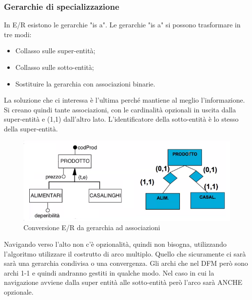 \subsubsection{Gerarchie di specializzazione}
In E/R esistono le gerarchie "is a". Le gerarchie "is a" si possono trasformare in tre modi:
\begin{itemize}
	\item Collasso sulle super-entità;
	\item Collasso sulle sotto-entità;
	\item Sostituire la gerarchia con associazioni binarie.
\end{itemize}
La soluzione che ci interessa è l'ultima perché mantiene al meglio l'informazione. Si creano quindi tante associazioni, con le cardinalità opzionali in uscita dalla super-entità e (1,1) dall'altro lato. L'identificatore della sotto-entità è lo stesso della super-entità.
\begin{figure}[H]
	\begin{center}
		\includegraphics[width=0.8\linewidth]{img/isaconversion.png}
		\caption{Conversione E/R da gerarchia ad associazioni}
	\end{center}
\end{figure}
\begin{warn}
	Navigando verso l'alto non c'è opzionalità, quindi non bisogna, utilizzando l'algoritmo utilizzare il costrutto di arco multiplo. Quello che sicuramente ci sarà sarà una gerarchia condivisa o una convergenza. Gli archi che nel DFM però sono archi 1-1 e quindi andranno gestiti in qualche modo. Nel caso in cui la navigazione avviene dalla super entità alle sotto-entità però l'arco sarà ANCHE opzionale.
\end{warn}

